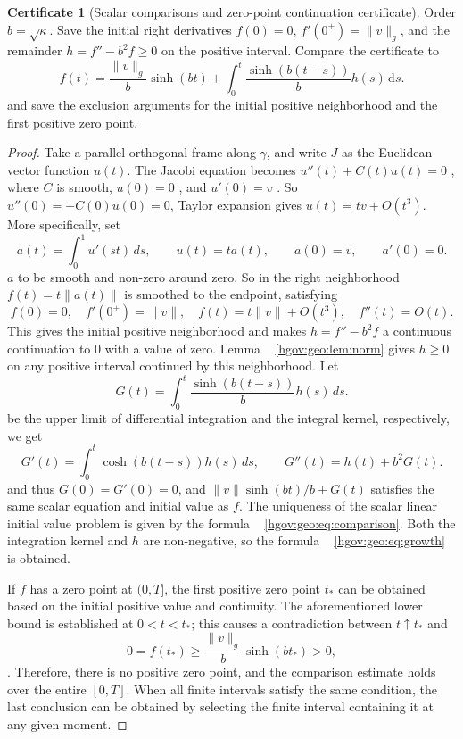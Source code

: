 \documentclass[12pt,a4paper,openany,notitlepage]{report}
\theoremstyle{plain}
\theoremstyle{definition}
\newtheorem*{certificate}{Certificate}
\theoremstyle{remark}
\begin{document}
\begin{CJK*}
\begin{certificate}
[Scalar comparisons and zero-point continuation certificate]Order $b=\sqrt\kappa$. Save the initial right derivatives $f(0)=0$, $f'(0^+)=\lVert v\rVert_g$, and the remainder $h=f''-b^2f\ge0$ on the positive interval. Compare the certificate to \begin{equation}
\label{hgov:geo:eq:comparison}
f(t)=\frac{\lVert v\rVert_g}{b}\sinh(bt)
+\int_0^t\frac{\sinh(b(t-s))}{b}h(s)\,\mathrm ds.
\end{equation} and save the exclusion arguments for the initial positive neighborhood and the first positive zero point.\end{certificate}


\begin{proof}
Take a parallel orthogonal frame along $\gamma$, and write $J$ as the Euclidean vector function $u(t)$. The Jacobi equation becomes $u''(t)+C(t)u(t)=0$ , where $C$ is smooth, $u(0)=0$ , and $u'(0)=v$ . So $u''(0)=-C(0)u(0)=0$, Taylor expansion gives $u(t)=tv+O(t^3)$. More specifically, set \[
a(t)=\int_0^1u'(st)\,ds,
\qquad u(t)=t a(t),\qquad a(0)=v,\qquad a'(0)=0.
\] $a$ to be smooth and non-zero around zero. So in the right neighborhood $f(t)=t\lVert a(t)\rVert$ is smoothed to the endpoint, satisfying \[
f(0)=0,\quad f'(0^+)=\lVert v\rVert,
\quad f(t)=t\lVert v\rVert+O(t^3),\quad f''(t)=O(t).
\] This gives the initial positive neighborhood and makes $h=f''-b^2f$ a continuous continuation to $0$ with a value of zero. Lemma ~ \ref{hgov:geo:lem:norm} gives $h\ge0$ on any positive interval continued by this neighborhood. Let \[
G(t)=\int_0^t\frac{\sinh(b(t-s))}{b}h(s)\,ds.
\] be the upper limit of differential integration and the integral kernel, respectively, we get \[
G'(t)=\int_0^t\cosh(b(t-s))h(s)\,ds,
\qquad
G''(t)=h(t)+b^2G(t).
\] and thus $G(0)=G'(0)=0$, and $\lVert v\rVert\sinh(bt)/b+G(t)$ satisfies the same scalar equation and initial value as $f$. The uniqueness of the scalar linear initial value problem is given by the formula ~ \eqref{hgov:geo:eq:comparison}. Both the integration kernel and $h$ are non-negative, so the formula ~ \eqref{hgov:geo:eq:growth} is obtained.

If $f$ has a zero point at $(0,T]$, the first positive zero point $t_*$ can be obtained based on the initial positive value and continuity. The aforementioned lower bound is established at $0<t<t_*$; this causes a contradiction between $t\uparrow t_*$ and \[
0=f(t_*)\ge\frac{\lVert v\rVert_g}{b}\sinh(bt_*)>0,
\]. Therefore, there is no positive zero point, and the comparison estimate holds over the entire $[0,T]$. When all finite intervals satisfy the same condition, the last conclusion can be obtained by selecting the finite interval containing it at any given moment.\end{proof}



\end{CJK*}
\end{document}
